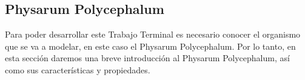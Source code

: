 \subsection{Physarum Polycephalum}
    \label{sec:PhysarumPolycephalum}
    Para poder desarrollar este Trabajo Terminal es necesario conocer el organismo que se va a modelar, 
        en este caso el Physarum Polycephalum. Por lo tanto, en esta secci\'on daremos una breve introducci\'on
        al Physarum Polycephalum, as\'i como sus caracter\'isticas y propiedades.
    \vskip 0.5cm
    
    
    
    